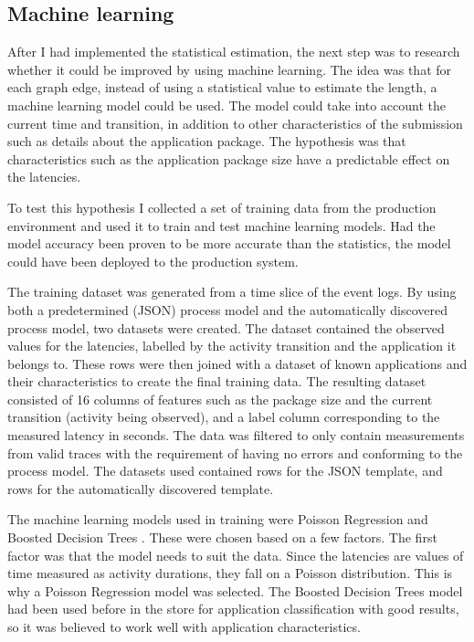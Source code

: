 

\subsection{Machine learning}
\label{sec:ml-estimation}

After I had implemented the statistical estimation, the next step was to research whether it could be improved by using machine learning. 
The idea was that for each graph edge, instead of using a statistical value to estimate the length, a machine learning model could be used.
The model could take into account the current time and transition, in addition to other characteristics of the submission such as details about the application package.
The hypothesis was that characteristics such as the application package size have a predictable effect on the latencies.

To test this hypothesis I collected a set of training data from the production environment and used it to train and test machine learning models.
Had the model accuracy been proven to be more accurate than the statistics, the model could have been deployed to the production system.

The training dataset was generated from a time slice of the event logs. 
By using both a predetermined (JSON) process model  and the automatically discovered process model, two datasets were created. The dataset contained the observed values for the latencies, labelled by the activity transition and the application it belongs to.
These rows were then joined with a dataset of known applications and their characteristics to create the final training data.
The resulting dataset consisted of 16 columns of features such as the package size and the current transition (activity being observed), and a label column corresponding to the measured latency in seconds. 
The data was filtered to only contain measurements from valid traces with the requirement of having no errors and conforming to the process model.
The datasets used contained  rows for the JSON template, and  rows for the automatically discovered template.

The machine learning models used in training were Poisson Regression \cite{azurepoisson} and Boosted Decision Trees \cite{azurebdt}.
These were chosen based on a few factors.
The first factor was that the model needs to suit the data.
Since the latencies are values of time measured as activity durations, they fall on a Poisson distribution. 
This is why a Poisson Regression model was selected.
The Boosted Decision Trees model had been used before in the store for application classification with good results, so it was believed to work well with application characteristics.

